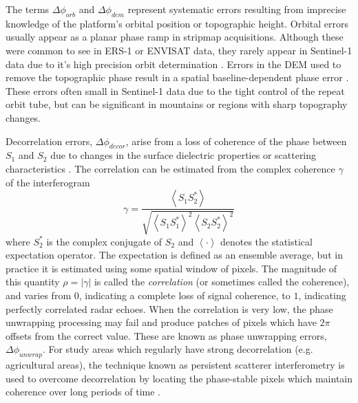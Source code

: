 The terms $ \Delta \phi_{orb} $ and $ \Delta \phi_{dem} $ represent systematic errors resulting from imprecise knowledge of the platform's orbital position or topographic height. Orbital errors usually appear as a planar phase ramp in stripmap acquisitions. Although these were common to see in ERS-1 or ENVISAT data, they rarely appear in Sentinel-1 data due to it's high precision orbit determination \citep{Fattahi2014InsarUncertaintyDue}. Errors in the DEM used to remove the topographic phase result in a spatial baseline-dependent phase error \citep{Fattahi2013DemErrorCorrection}. These errors often small in Sentinel-1 data due to the tight control of the repeat orbit tube, but can be significant in mountains or regions with sharp topography changes.

Decorrelation errors, $ \Delta \phi_{decor} $, arise from a loss of coherence of the phase between $S_1$ and $S_2$ due to changes in the surface dielectric properties or scattering characteristics \citep{Zebker1992DecorrelationInterferometricRadar, Michaelides2019AlgorithmEstimatingCorrecting, Ansari2018EfficientHighPrecision}. 
The correlation can be estimated from the complex coherence $\gamma $ of the interferogram \cite{Bamler1998SyntheticApertureRadar}
\begin{equation}
	\gamma = \frac{\left\langle S_1 S_2^{*} \right\rangle }{\sqrt{\left\langle S_1 S_1^{*} \right\rangle^2 \left\langle S_2 S_2^{*} \right\rangle^2}}
\end{equation}
where $ S_2^{*} $ is the complex conjugate of $ S_2 $ and $ \left\langle \cdot \right\rangle  $ denotes the statistical expectation operator. The expectation is defined as an ensemble average, but in practice it is estimated using some spatial window of pixels. 
The magnitude of this quantity $ \rho = |\gamma | $ is called the \emph{correlation} (or sometimes called the coherence), and varies from $ 0 $, indicating a complete loss of signal coherence, to $ 1 $, indicating perfectly correlated radar echoes.
When the correlation is very low, the phase unwrapping processing may fail and produce patches of pixels which have $2 \pi$ offsets from the correct value. These are known as phase unwrapping errors, $ \Delta \phi_{unwrap}  $. For study areas which regularly have strong decorrelation (e.g. agricultural areas), the technique known as persistent scatterer interferometry is used to overcome decorrelation by locating the phase-stable pixels which maintain coherence over long periods of time \citep{Ferretti2001PermanentScatterersSar, Agram2010PersistentScattererInterferometry, Hooper2006PersistentScatterRadar}.




